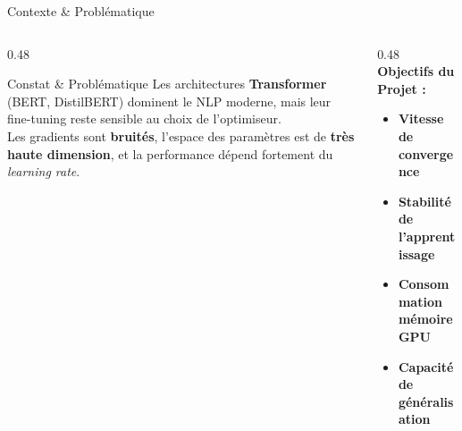 \documentclass[10pt, aspectratio=169]{beamer}
\begin{document}
\begin{frame}{Contexte \& Problématique}
    \vspace{0.1cm}
    \begin{columns}[t]
        \begin{column}{0.48\textwidth}
            \begin{block}{\faExclamationTriangle\quad Constat \& Problématique}
                \vspace{0.2cm}
                \footnotesize
                Les architectures \textbf{Transformer} (BERT, DistilBERT) dominent le NLP moderne, mais leur fine-tuning reste sensible au choix de l'optimiseur.
                \\[8pt]
                Les gradients sont \textbf{bruités}, l'espace des paramètres est de \textbf{très haute dimension}, et la performance dépend fortement du \textit{learning rate}.
                \vspace{0.2cm}
            \end{block}
        \end{column}
        \begin{column}{0.48\textwidth}
            \vspace{0.1cm}
            {\large \bfseries \color{StartupBlue} Objectifs du Projet :}
            \vspace{0.3cm}
            \begin{itemize}
                \setlength{\itemsep}{10pt}
                \item[\color{StartupCyan}\faRunning] \textbf{Vitesse de convergence}
                \item[\color{StartupCyan}\faWaveSquare] \textbf{Stabilité de l'apprentissage}
                \item[\color{StartupCyan}\faMemory] \textbf{Consommation mémoire GPU}
                \item[\color{StartupCyan}\faChartLine] \textbf{Capacité de généralisation}
            \end{itemize}
        \end{column}
    \end{columns}
\end{frame}

\end{document}
